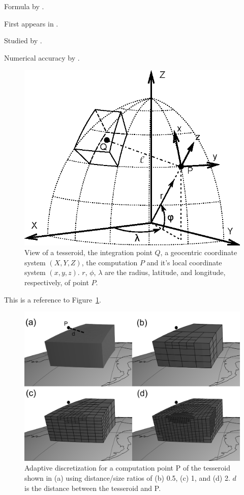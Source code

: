 \documentclass[paper,twocolumn,twoside]{geophysics}
\begin{document}
Formula by \citet{Grombein2013}.

First appears in \citet{Asgharzadeh2007}.

Studied by \citet{Wild-Pfeiffer2008}.

Numerical accuracy by \citet{Ku1977}.

\begin{figure}
    \centering
    \includegraphics[width=\columnwidth]{figs/tesseroid}
    \caption{
        View of a tesseroid,
        the integration point $Q$,
        a geocentric coordinate system $(X, Y, Z)$,
        the computation $P$ and it's local coordinate system $(x, y, z)$.
        $r$, $\phi$, $\lambda$ are
        the radius, latitude, and longitude, respectively, of point $P$.
    }
    \label{fig:tesseroid}
\end{figure}

This is a reference to Figure~\ref{fig:tesseroid}.

\begin{figure}
    \centering
    \includegraphics[width=\columnwidth]{figs/tesseroid-split.png}
    \caption{
        Adaptive discretization for a computation point P
        of the tesseroid shown in (a) using distance/size ratios of
        (b) 0.5, (c) 1, and (d) 2.
        $d$ is the distance between the tesseroid and P.
    }
    \label{fig:split}
\end{figure}
\end{document}
